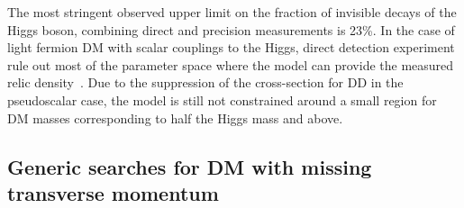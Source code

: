 The most stringent observed upper limit on the fraction of invisible decays of the Higgs boson, combining direct and precision measurements is 23\%.
In the case of light fermion DM with scalar couplings to the Higgs, direct detection experiment rule out most of the parameter space where the model can provide the measured relic density~\cite{Escudero:2016gzx,Djouadi:2011aa}. Due to the suppression of the cross-section for DD in the pseudoscalar case, the model is still not constrained around a small region for DM masses corresponding to half the Higgs mass and above. %

\subsection{Generic searches for DM with missing transverse momentum}
\label{sec:results_monoXSearches}

